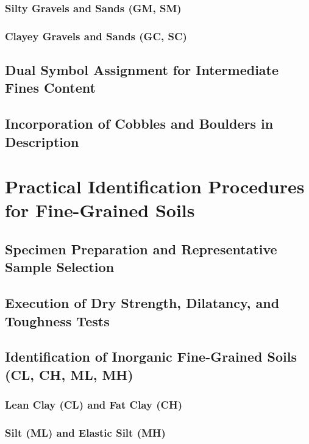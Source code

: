 \subsubsection{Silty Gravels and Sands (GM, SM)}

\subsubsection{Clayey Gravels and Sands (GC, SC)}

\subsection{Dual Symbol Assignment for Intermediate Fines Content}

\subsection{Incorporation of Cobbles and Boulders in Description}

\section{Practical Identification Procedures for Fine-Grained Soils}

\subsection{Specimen Preparation and Representative Sample Selection}

\subsection{Execution of Dry Strength, Dilatancy, and Toughness Tests}

\subsection{Identification of Inorganic Fine-Grained Soils (CL, CH, ML, MH)}

\subsubsection{Lean Clay (CL) and Fat Clay (CH)}

\subsubsection{Silt (ML) and Elastic Silt (MH)}

